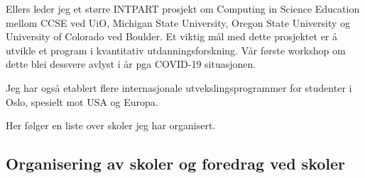 \documentclass[aps,floatfix,preprint]{revtex4-1}
\begin{document}
Ellers leder jeg et større INTPART prosjekt om Computing in Science
Education mellom CCSE ved UiO, Michigan State University, Oregon State
University og University of Colorado ved Boulder. Et viktig mål med
dette prosjektet er å utvikle et program i kvantitativ utdanningsforskning. Vår
første workshop om dette blei  dessvere avlyst i år pga COVID-19 situasjonen.

Jeg har også etablert flere internasjonale utvekslingsprogrammer for
studenter i Oslo, spesielt mot USA og Europa.

Her følger en liste over skoler jeg har organisert.

\subsection*{Organisering av skoler og foredrag ved skoler}
\end{document}
